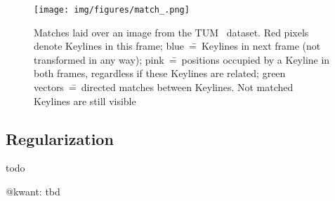 \begin{figure}[ht]
	\centering\texttt{[image: img/figures/match\_.png]}
	\caption{ Matches laid over an image from the TUM~\cite{tum} dataset. Red pixels denote Keylines in this frame; blue~\==~Keylines in next frame (not transformed in any way); pink~\==~positions occupied by a Keyline in both frames, regardless if these Keylines are related; green vectors~\==~directed matches between Keylines. Not matched Keylines are still visible }
	\label{fig:match}
\end{figure}

\subsection{Regularization}

%
%

todo

@kwant: tbd



%
%
%
%



